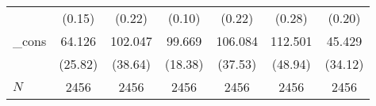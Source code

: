 {\begin{tabular}{l*{6}{c}}
            &                   (0.15)         &                   (0.22)         &                   (0.10)         &                   (0.22)         &                   (0.28)         &                   (0.20)         \\
\_cons      &                   64.126\sym{*}  &                  102.047\sym{**} &                   99.669\sym{***}&                  106.084\sym{**} &                  112.501\sym{*}  &                   45.429         \\
            &                  (25.82)         &                  (38.64)         &                  (18.38)         &                  (37.53)         &                  (48.94)         &                  (34.12)         \\
\hline
\(N\)       &                     2456         &                     2456         &                     2456         &                     2456         &                     2456         &                     2456         \\
\hline\hline
\end{tabular}
}
